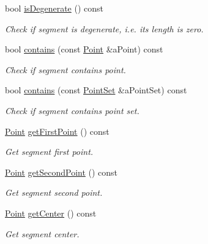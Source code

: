 \begin{DoxyCompactItemize}
bool \hyperlink{classlibrary_1_1math_1_1geom_1_1d2_1_1objects_1_1_segment_a0ed58e12b0d91a83fdea0c13308a3d37}{is\+Degenerate} () const
\begin{DoxyCompactList}\small\item\em Check if segment is degenerate, i.\+e. its length is zero. \end{DoxyCompactList}\item 
bool \hyperlink{classlibrary_1_1math_1_1geom_1_1d2_1_1objects_1_1_segment_ac72deb794d609e44ccddf1cde25a7c2d}{contains} (const \hyperlink{classlibrary_1_1math_1_1geom_1_1d2_1_1objects_1_1_point}{Point} \&a\+Point) const
\begin{DoxyCompactList}\small\item\em Check if segment contains point. \end{DoxyCompactList}\item 
bool \hyperlink{classlibrary_1_1math_1_1geom_1_1d2_1_1objects_1_1_segment_a501ffbc0492c4b9e279bba7b7a79ae89}{contains} (const \hyperlink{classlibrary_1_1math_1_1geom_1_1d2_1_1objects_1_1_point_set}{Point\+Set} \&a\+Point\+Set) const
\begin{DoxyCompactList}\small\item\em Check if segment contains point set. \end{DoxyCompactList}\item 
\hyperlink{classlibrary_1_1math_1_1geom_1_1d2_1_1objects_1_1_point}{Point} \hyperlink{classlibrary_1_1math_1_1geom_1_1d2_1_1objects_1_1_segment_aa78aa20d97d8d9cb23737260e7e308b5}{get\+First\+Point} () const
\begin{DoxyCompactList}\small\item\em Get segment first point. \end{DoxyCompactList}\item 
\hyperlink{classlibrary_1_1math_1_1geom_1_1d2_1_1objects_1_1_point}{Point} \hyperlink{classlibrary_1_1math_1_1geom_1_1d2_1_1objects_1_1_segment_acf79cfdb28dec7d497382a3ea650491c}{get\+Second\+Point} () const
\begin{DoxyCompactList}\small\item\em Get segment second point. \end{DoxyCompactList}\item 
\hyperlink{classlibrary_1_1math_1_1geom_1_1d2_1_1objects_1_1_point}{Point} \hyperlink{classlibrary_1_1math_1_1geom_1_1d2_1_1objects_1_1_segment_a964684b33e11314a0b818fb089a197e6}{get\+Center} () const
\begin{DoxyCompactList}\small\item\em Get segment center. \end{DoxyCompactList}\item 

\end{DoxyCompactItemize}
